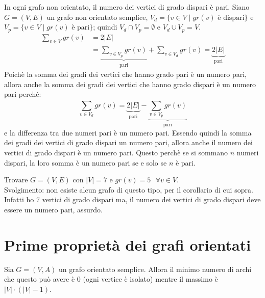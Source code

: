 \begin{cor}
    In ogni grafo non orientato, il numero dei vertici di grado dispari è pari.
\proof
    Siano $G=(V,E)$ un grafo non orientato semplice, ${V_d = \{v \in V \mid gr(v) \text{ è dispari}\}}$ e
    ${V_p = \{v \in V \mid gr(v) \text{ è pari}\}}$; quindi ${V_d \cap V_p = \emptyset}$ e 
    ${V_d \cup V_p = V}$.
    \begin{equation*}
    \begin{split}
        \sum_{v \in V}^{} gr(v) & = 
        2|E| \\ & = 
        \underbrace{{\sum_{v \in V_p}^{} gr(v)}}_{\text{pari}} + {\sum_{v \in V_d}^{} gr(v)} = 
        \underbrace{2|E|}_{\text{pari}}
    \end{split}
    \end{equation*}
    Poichè la somma dei gradi dei vertici che hanno grado pari è un numero pari, 
    allora anche la somma dei gradi dei vertici che hanno grado dispari è un numero pari perché:
    \[
        {\sum_{v \in V_d}^{} gr(v)} = \underbrace{2|E|}_{\text{pari}} - 
                \underbrace{{\sum_{v \in V_p}^{} gr(v)}}_{\text{pari}}
    \]
    e la differenza tra due numeri pari è un numero pari. Essendo quindi la somma dei gradi dei vertici
    di grado dispari un numero pari, allora anche il numero dei vertici di grado dispari è un numero
    pari. Questo perchè se si sommano $n$ numeri dispari, la loro somma è un numero pari 
    se e solo se $n$ è pari.
\endproof
\end{cor}

\begin{eser}
    Trovare $G=(V,E)$ con $|V| = 7$ e ${gr(v) = 5 \text{ } \forall v \in V}$.\\
    Svolgimento: non esiste alcun grafo di questo tipo, per il corollario di cui sopra.
    Infatti ho $7$ vertici di grado dispari ma, il numero dei vertici di grado dispari
    deve essere un numero pari, assurdo. \QEDA
\end{eser}




\section{Prime proprietà dei grafi orientati}
Sia $G=(V,A)$ un grafo orientato semplice. Allora il minimo numero di archi che questo può
avere è $0$ (ogni vertice è isolato) mentre il massimo è ${|V| \cdot (|V|-1)}$.

